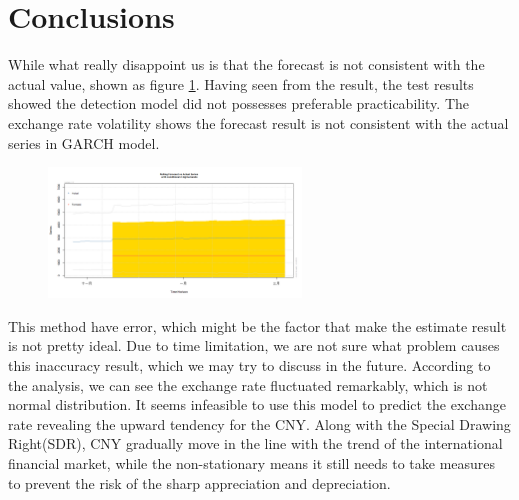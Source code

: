 \documentclass[12pt, a4paper, titlepage]{article}
\begin{document}
\section{Conclusions}
While what really disappoint us is that the forecast is not consistent with the actual value, shown as figure \ref{volatility}. Having seen from the result, the test results showed the detection model did not possesses preferable practicability. The exchange rate volatility shows the forecast result is not consistent with the actual series in GARCH model.\\
\begin{figure}[h!]
\begin{center}
\caption{}\label{volatility}
\includegraphics[width=0.6\textwidth]{forecast.jpg}
\end{center}
\end{figure}

This method have error, which might be the factor that make the estimate result is not pretty ideal. Due to time limitation, we are not sure what problem causes this inaccuracy result, which we may try to discuss in the future. According to the analysis, we can see the exchange rate fluctuated remarkably, which is not normal distribution. It seems infeasible to use this model to predict the exchange rate revealing the upward tendency for the CNY. Along with the Special Drawing Right(SDR), CNY gradually move in the line with the trend of the international financial market, while the non-stationary means it still needs to take measures to prevent the risk of the sharp appreciation and depreciation.\\
\end{document}
